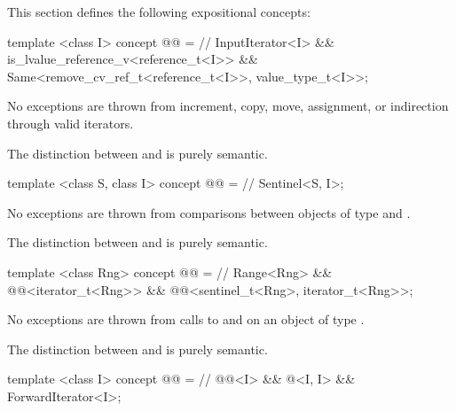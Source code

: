 {\color{addclr}
\setcounter{Paras}{0}
\pnum This section defines the following expositional concepts:

\begin{itemdecl}
template <class I>
concept @@ = // \expos
  InputIterator<I> &&
  is_lvalue_reference_v<reference_t<I>> &&
  Same<remove_cv_ref_t<reference_t<I>>, value_type_t<I>>;
\end{itemdecl}

\begin{itemdescr}
\pnum No exceptions are thrown from increment, copy, move, assignment, or indirection through valid
iterators.

\pnum
\enternote The distinction between  and
 is purely semantic.\exitnote
\end{itemdescr}

\begin{itemdecl}
template <class S, class I>
concept @@ = // \expos
  Sentinel<S, I>;
\end{itemdecl}

\begin{itemdescr}
\pnum No exceptions are thrown from comparisons between objects of type  and .

\pnum
\enternote The distinction between  and
 is purely semantic.\exitnote
\end{itemdescr}

\begin{itemdecl}
template <class Rng>
concept @@ = // \expos
  Range<Rng> &&
  @@<iterator_t<Rng>> &&
  @@<sentinel_t<Rng>, iterator_t<Rng>>;
\end{itemdecl}

\begin{itemdescr}
\pnum No exceptions are thrown from calls to  and  on an object of type
.

\pnum
\enternote The distinction between  and
 is purely semantic.\exitnote
\end{itemdescr}

\begin{itemdecl}
template <class I>
concept @@ = // \expos
  @@<I> &&
  @<I, I> &&
  ForwardIterator<I>;
\end{itemdecl}

}
